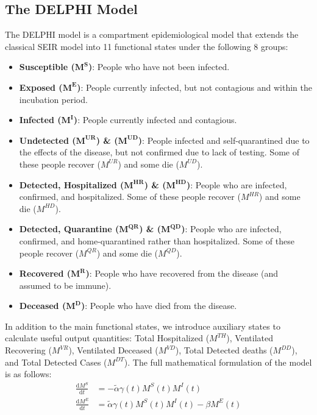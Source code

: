 \documentclass[msom,blindrev]{informs3} %
\begin{document}
\begin{APPENDICES}
\section{The DELPHI Model}
\label{app:delphi_fitting_procedure}
The DELPHI model is a compartment epidemiological model that extends the classical SEIR model into 11 functional states under the following 8 groups:
\begin{itemize}[topsep=0pt,itemsep=0pt]
    \item \textbf{Susceptible ($\bm{M^S}$)}: People who have not been infected.
    \item \textbf{Exposed ($\bm{M^E}$)}: People currently infected, but not contagious and within the incubation period. 
    \item \textbf{Infected ($\bm{M^I}$)}: People currently infected and contagious. 
    \item \textbf{Undetected ($\bm{M^{UR}}$) \& ($\bm{M^{UD}}$)}: People infected and self-quarantined due to the effects of the disease, but not confirmed due to lack of testing. Some of these people recover ($M^{UR}$) and some die ($M^{UD}$).
    \item \textbf{Detected, Hospitalized ($\bm{M^{HR}}$) \& ($\bm{M^{HD}}$)}: People who are infected, confirmed, and hospitalized. Some of these people recover ($M^{HR}$) and some die ($M^{HD}$).
    \item \textbf{Detected, Quarantine ($\bm{M^{QR}}$) \& ($\bm{M^{QD}}$)}: People who are infected, confirmed, and home-quarantined rather than hospitalized. Some of these people recover ($M^{QR}$) and some die ($M^{QD}$).
    \item \textbf{Recovered ($\bm{M^{R}}$)}: People who have recovered from the disease (and assumed to be immune).
    \item \textbf{Deceased ($\bm{M^{D}}$)}:  People who have died from the disease. 
 \end{itemize}
In addition to the main functional states, we introduce auxiliary states to calculate useful output quantities: Total Hospitalized ($M^{TH}$), Ventilated Recovering ($M^{VR}$), Ventilated Deceased ($M^{VD}$), Total Detected deaths ($M^{DD}$), and Total Detected Cases ($M^{DT}$). The full mathematical formulation of the model is as follows:
\begin{align*}
\frac{\mathrm{d} M^S}{\mathrm{d} t} &= -\widetilde{\alpha} \gamma(t)M^S(t)M^I(t) \\
\frac{\mathrm{d} M^E}{\mathrm{d} t} &= \widetilde{\alpha} \gamma(t)M^S(t)M^I(t)-\beta M^E(t) \\

\end{align*}
\end{APPENDICES}
\end{document}
